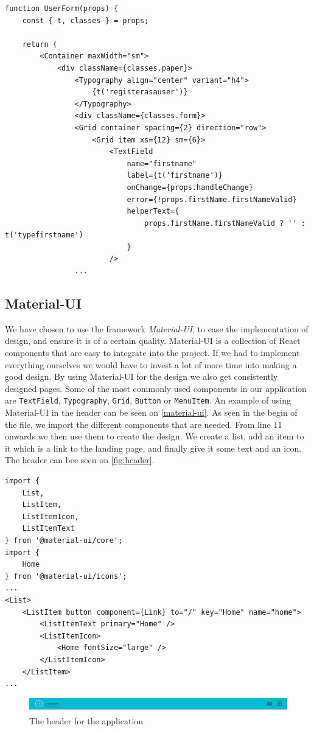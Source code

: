 \begin{lstlisting}[caption={Presentational component for userform}, captionpos=b, label={user-form}]
function UserForm(props) {
    const { t, classes } = props;
    
    return (
        <Container maxWidth="sm">
            <div className={classes.paper}>
                <Typography align="center" variant="h4">
                    {t('registerasauser')}
                </Typography>
                <div className={classes.form}>
                <Grid container spacing={2} direction="row">
                    <Grid item xs={12} sm={6}>
                        <TextField
                            name="firstname"
                            label={t('firstname')}
                            onChange={props.handleChange}
                            error={!props.firstName.firstNameValid}
                            helperText={
                                props.firstName.firstNameValid ? '' : t('typefirstname')
                            }
                        />
                ...
\end{lstlisting}

\subsection{Material-UI}
We have chosen to use the framework \textit{Material-UI}, to ease the implementation of design, and ensure it is of a certain quality.
Material-UI is a collection of React components that are easy to integrate into the project.
If we had to implement everything ourselves we would have to invest a lot of more time into making a good design.
By using Material-UI for the design we also get consistently designed pages.
Some of the most commonly used components in our application are \texttt{TextField}, \texttt{Typography}, \texttt{Grid}, \texttt{Button} or \texttt{MenuItem}.
An example of using Material-UI in the header can be seen on \autoref{material-ui}.
As seen in the begin of the file, we import the different components that are needed.
From line 11 onwards we then use them to create the design.
We create a list, add an item to it which is a link to the landing page, and finally give it some text and an icon.
The header can bee seen on \autoref{fig:header}.
\begin{lstlisting}[caption={Use of material-ui in the header}, captionpos=b, label={material-ui}]
import {
    List,
    ListItem,
    ListItemIcon,
    ListItemText
} from '@material-ui/core';
import {
	Home
} from '@material-ui/icons';
...
<List>
    <ListItem button component={Link} to="/" key="Home" name="home">
        <ListItemText primary="Home" />
        <ListItemIcon>
            <Home fontSize="large" />
        </ListItemIcon>
    </ListItem>
...
\end{lstlisting}


\begin{figure}[H]
    \includegraphics[width=\linewidth]{figures/header.png}
    \caption{The header for the application}
    \label{fig:header}
\end{figure}
  
